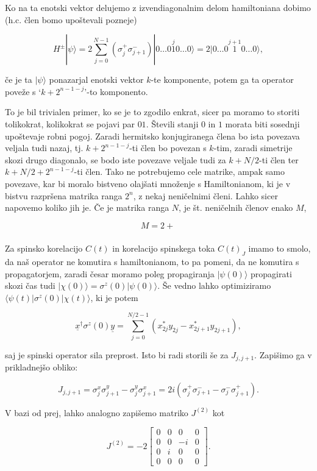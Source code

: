 \documentclass[a4 paper, 12pt]{article}
\begin{document}
Ko na ta enotski vektor delujemo z izvendiagonalnim delom hamiltoniana dobimo (h.c. člen bomo upoštevali pozneje)

\[
	H^\pm|\psi\rangle = 2\sum_{j=0}^{N-1}(\sigma^+_j\sigma^-_{j+1})
		|0\ldots0\stackrel{j}{1}0\ldots0\rangle = 2|0\ldots0\stackrel{j+1}{1}0\ldots0\rangle,
\]

če je ta $|\psi\rangle$ ponazarjal enotski vektor $k$-te komponente, potem ga ta operator poveže s
`$k + 2^{n-1-j}$'-to komponento.

To je bil trivialen primer, ko se je to zgodilo enkrat, sicer pa moramo to storiti tolikokrat, kolikokrat se
pojavi par $01$. Števili stanji $0$ in $1$ morata biti sosednji upoštevaje robni pogoj.
Zaradi hermitsko konjugiranega člena bo ista povezava veljala
tudi nazaj, tj.
$k + 2^{n-1-j}$-ti člen bo povezan s $k$-tim, zaradi simetrije skozi drugo diagonalo, se bodo iste povezave
veljale tudi za $k+N/2$-ti člen ter $k+N/2+2^{n-1-j}$-ti člen. Tako ne potrebujemo cele matrike, ampak samo
povezave, kar bi moralo bistveno olajšati množenje s Hamiltonianom, ki je v bistvu razpršena matrika ranga
$2^n$, z nekaj neničelnimi členi. Lahko sicer napovemo koliko jih je. Če je matrika ranga $N$, je št.
neničelnih členov enako $M$,

\[
	M = 2 + \frac{}{}
\]

Za spinsko korelacijo $C(t)$ in korelacijo spinskega toka $C(t)_J$ imamo to smolo, da naš operator ne
komutira s hamiltonianom, to pa pomeni, da ne komutira s propagatorjem, zaradi česar moramo poleg propagiranja
$|\psi(0)\rangle$ propagirati skozi čas tudi $|\chi (0)\rangle = \sigma^z (0)|\psi (0)\rangle$. Še vedno
lahko optimiziramo $\langle \psi(t)|\sigma^z(0)|\chi(t)\rangle$, ki je potem

\[
	\underline{x}^\dagger \sigma^z(0) \underline{y} = \sum_{j = 0}^{N/2 - 1} (x^*_{2j}y_{2j} -
		x^*_{2j+1}y_{2j+1}),
\]

saj je spinski operator sila preprost. Isto bi radi storili še za $J_{j,j+1}$. Zapišimo ga v prikladnejšo obliko:

\[
	J_{j,j+1} = \sigma^x_j\sigma^y_{j+1} - \sigma^y_j\sigma^x_{j+1} =
		2i(\sigma^+_j \sigma^-_{j+1} - \sigma^-_j\sigma^+_{j+1}).
\]

V bazi od prej, lahko analogno zapišemo matriko $J^{(2)}$ kot

\[
	J^{(2)} = -2\begin{bmatrix}
		0 & 0 & 0 & 0 \\
		0 & 0 & -i & 0 \\
		0 & i & 0 & 0 \\
		0 & 0 & 0 & 0
		\end{bmatrix}.
\]
\end{document}
